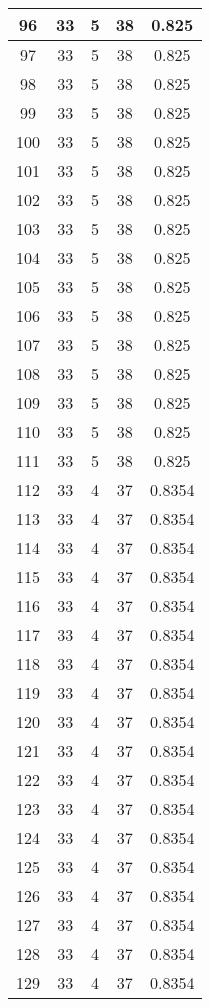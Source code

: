 \documentclass[letterpaper, 12pt]{article}
\begin{document}
\begin{longtable}{|c|c|c|c|c|}
\hline
96 & 33 & 5 & 38 & 0.825 \\
\hline
97 & 33 & 5 & 38 & 0.825 \\
\hline
98 & 33 & 5 & 38 & 0.825 \\
\hline
99 & 33 & 5 & 38 & 0.825 \\
\hline
100 & 33 & 5 & 38 & 0.825 \\
\hline
101 & 33 & 5 & 38 & 0.825 \\
\hline
102 & 33 & 5 & 38 & 0.825 \\
\hline
103 & 33 & 5 & 38 & 0.825 \\
\hline
104 & 33 & 5 & 38 & 0.825 \\
\hline
105 & 33 & 5 & 38 & 0.825 \\
\hline
106 & 33 & 5 & 38 & 0.825 \\
\hline
107 & 33 & 5 & 38 & 0.825 \\
\hline
108 & 33 & 5 & 38 & 0.825 \\
\hline
109 & 33 & 5 & 38 & 0.825 \\
\hline
110 & 33 & 5 & 38 & 0.825 \\
\hline
111 & 33 & 5 & 38 & 0.825 \\
\hline
112 & 33 & 4 & 37 & 0.8354 \\
\hline
113 & 33 & 4 & 37 & 0.8354 \\
\hline
114 & 33 & 4 & 37 & 0.8354 \\
\hline
115 & 33 & 4 & 37 & 0.8354 \\
\hline
116 & 33 & 4 & 37 & 0.8354 \\
\hline
117 & 33 & 4 & 37 & 0.8354 \\
\hline
118 & 33 & 4 & 37 & 0.8354 \\
\hline
119 & 33 & 4 & 37 & 0.8354 \\
\hline
120 & 33 & 4 & 37 & 0.8354 \\
\hline
121 & 33 & 4 & 37 & 0.8354 \\
\hline
122 & 33 & 4 & 37 & 0.8354 \\
\hline
123 & 33 & 4 & 37 & 0.8354 \\
\hline
124 & 33 & 4 & 37 & 0.8354 \\
\hline
125 & 33 & 4 & 37 & 0.8354 \\
\hline
126 & 33 & 4 & 37 & 0.8354 \\
\hline
127 & 33 & 4 & 37 & 0.8354 \\
\hline
128 & 33 & 4 & 37 & 0.8354 \\
\hline
129 & 33 & 4 & 37 & 0.8354 \\
\hline

\end{longtable}
\end{document}
